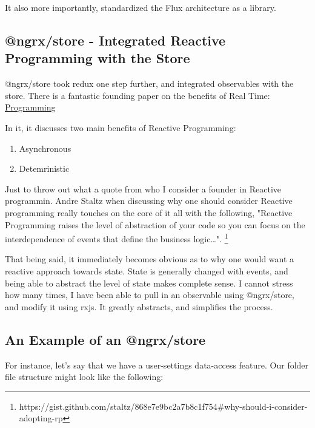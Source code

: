 It also more importantly, standardized the Flux architecture as a library.

\subsection{@ngrx/store - Integrated Reactive Programming with the Store}
@ngrx/store took redux one step further, and integrated observables with the
store. There is a fantastic founding paper on the benefits of Real Time:
\href{http://www-sop.inria.fr/members/Gerard.Berry/Papers/Berry-IFIP-89.pdf}{Programming}

In it, it discusses two main benefits of Reactive Programming:
\begin{enumerate}
  \item Asynchronous
  \item Detemrinistic
\end{enumerate}

Just to throw out what a quote from who I consider a founder in Reactive
programmin. Andre Staltz when discussing why one should consider Reactive
programming really touches on the core of it all with the following, "Reactive
Programming raises the level of abstraction of your code so you can focus on 
the interdependence of events that define the business logic\ldots".
\footnote{https://gist.github.com/staltz/868e7e9bc2a7b8c1f754\#why-should-i-consider-adopting-rp}

That being said, it immediately becomes obvious as to why one would want a
reactive approach towards state. State is generally changed with events, and
being able to abstract the level of state makes complete sense. I cannot stress
how many times, I have been able to pull in an observable using @ngrx/store, and
modify it using rxjs. It greatly abstracts, and simplifies the process.


\subsection{ An Example of an @ngrx/store }

For instance, let's say that we have a user-settings data-access feature. Our
folder file structure might look like the following:
% 


